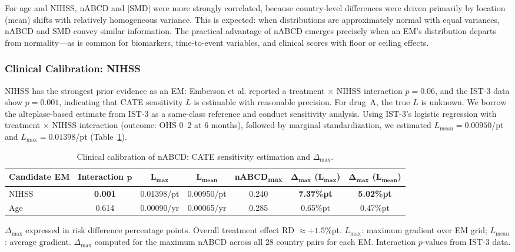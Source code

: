 \documentclass[AMA,Times1COL]{WileyNJDv5}
\begin{document}
For age and NIHSS, nABCD and $|\text{SMD}|$ were more strongly correlated, because country-level differences were driven primarily by location (mean) shifts with relatively homogeneous variance. This is expected: when distributions are approximately normal with equal variances, nABCD and SMD convey similar information. The practical advantage of nABCD emerges precisely when an EM's distribution departs from normality---as is common for biomarkers, time-to-event variables, and clinical scores with floor or ceiling effects.

\subsubsection{Clinical Calibration: NIHSS}\label{sec:case_b_nihss}

NIHSS has the strongest prior evidence as an EM: Emberson et al.\cite{emberson2014} reported a treatment $\times$ NIHSS interaction $p = 0.06$, and the IST-3 data show $p = 0.001$, indicating that CATE sensitivity $L$ is estimable with reasonable precision. For drug~A, the true $L$ is unknown. We borrow the alteplase-based estimate from IST-3 as a same-class reference and conduct sensitivity analysis. Using IST-3's logistic regression with treatment $\times$ NIHSS interaction (outcome: OHS 0--2 at 6 months), followed by marginal standardization, we estimated $L_{\text{mean}} = 0.00950$/pt and $L_{\max} = 0.01398$/pt (Table~\ref{tab:ist3_calibration}).

\begin{table}[ht]
\caption{Clinical calibration of nABCD: CATE sensitivity estimation and $\Delta_{\max}$.\label{tab:ist3_calibration}}
\begin{tabular*}{\textwidth}{@{\extracolsep\fill}lcccccc@{}}
\toprule
\textbf{Candidate EM} & \textbf{Interaction} $\boldsymbol{p}$ & $\boldsymbol{L_{\max}}$ & $\boldsymbol{L_{\text{mean}}}$ & \textbf{nABCD\textsubscript{max}} & $\boldsymbol{\Delta_{\max}}$ ($\boldsymbol{L_{\max}}$) & $\boldsymbol{\Delta_{\max}}$ ($\boldsymbol{L_{\text{mean}}}$) \\
\midrule
NIHSS & \textbf{0.001} & 0.01398/pt & 0.00950/pt & 0.240 & \textbf{7.37\%pt} & \textbf{5.02\%pt} \\
Age & 0.614 & 0.00090/yr & 0.00065/yr & 0.285 & 0.65\%pt & 0.47\%pt \\
\bottomrule
\end{tabular*}
\begin{tablenotes}
\item $\Delta_{\max}$ expressed in risk difference percentage points. Overall treatment effect RD $\approx +1.5$\%pt. $L_{\max}$: maximum gradient over EM grid; $L_{\text{mean}}$: average gradient. $\Delta_{\max}$ computed for the maximum nABCD across all 28 country pairs for each EM. Interaction $p$-values from IST-3 data.
\end{tablenotes}
\end{table}
\end{document}
